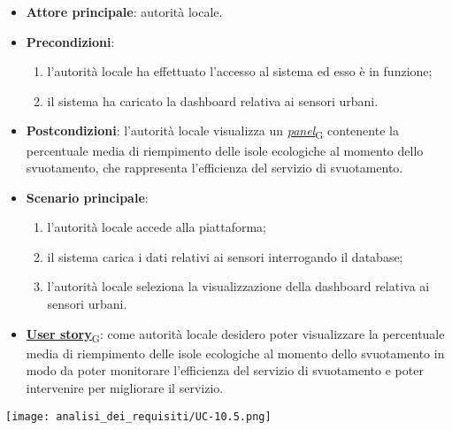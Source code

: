 \begin{itemize}
	\item \textbf{Attore principale}: autorità locale.
	\item \textbf{Precondizioni}:
	      \begin{enumerate}
		      \item l'autorità locale ha effettuato l'accesso al sistema ed esso è in funzione;
		      \item il sistema ha caricato la dashboard relativa ai sensori urbani.
	      \end{enumerate}
	\item \textbf{Postcondizioni}: l'autorità locale visualizza un \href{https://7last.github.io/docs/rtb/documentazione-interna/glossario\#panel}{\textit{panel}\textsubscript{G}} contenente la percentuale media di riempimento delle isole ecologiche al momento dello svuotamento,
	      che rappresenta l'efficienza del servizio di svuotamento.
	\item \textbf{Scenario principale}:
	      \begin{enumerate}
		      \item l'autorità locale accede alla piattaforma;
		      \item il sistema carica i dati relativi ai sensori interrogando il database;
		      \item l'autorità locale seleziona la visualizzazione della dashboard relativa ai sensori urbani.
	      \end{enumerate}
	\item \href{https://7last.github.io/docs/rtb/documentazione-interna/glossario\#user-story}{\textbf{User story}\textsubscript{G}}:
	      come autorità locale desidero poter visualizzare la percentuale media di riempimento delle isole ecologiche al momento dello svuotamento in modo da poter monitorare
	      l'efficienza del servizio di svuotamento e poter intervenire per migliorare il servizio.
\end{itemize}
\begin{center}
	\texttt{[image: analisi\_dei\_requisiti/UC-10.5.png]}
\end{center}

